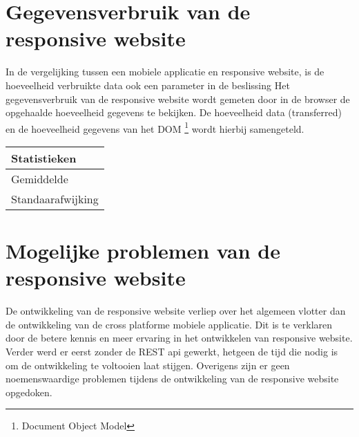 \section{Gegevensverbruik van de responsive website}
In de vergelijking tussen een mobiele applicatie en responsive website, is de hoeveelheid verbruikte data ook een parameter in de beslissing
Het gegevensverbruik van de responsive website wordt gemeten door in de browser de opgehaalde hoeveelheid gegevens te bekijken.
De hoeveelheid data (transferred) en de hoeveelheid gegevens van het DOM \footnote{Document Object Model} wordt hierbij samengeteld.

\begin{center}
\begin{tabular}{| l }
  \hline
  Statistieken \\ \hline
  Gemiddelde \\ \hline
  Standaarafwijking \\ \hline
\end{tabular}
\end{center}
\section{Mogelijke problemen van de responsive website}
De ontwikkeling van de responsive website verliep over het algemeen vlotter dan de ontwikkeling van de cross platforme mobiele applicatie.
Dit is te verklaren door de betere kennis en meer ervaring in het ontwikkelen van responsive website.
Verder werd er eerst zonder de REST api gewerkt, hetgeen de tijd die nodig is om de ontwikkeling te voltooien laat stijgen.
Overigens zijn er geen noemenswaardige problemen tijdens de ontwikkeling van de responsive website opgedoken.
